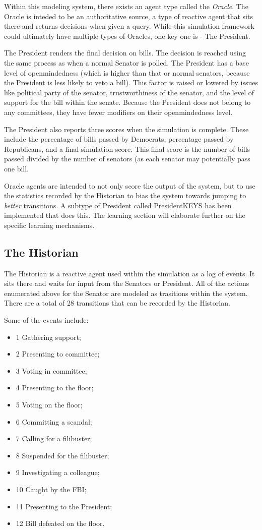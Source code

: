 \documentclass{sig-alternate}
\newenvironment{smallitem}
 {\setlength{\topsep}{0pt}
  \setlength{\partopsep}{0pt}
  \setlength{\parskip}{0pt}
  \begin{itemize}
   \setlength{\leftmargin}{.2in}
  \setlength{\parsep}{0pt}
  \setlength{\parskip}{0pt}
  \setlength{\itemsep}{0pt}}
 {\end{itemize}}
\newcommand{\bi}{\begin{smallitem}}
\newcommand{\ei}{\end{smallitem}}
\begin{document}
Within this modeling system, there exists an agent type called the {\em Oracle}. The Oracle is inteded to be an authoritative source, a type 
of reactive agent that sits there and returns decisions when given
a query. While this simulation framework could ultimately have 
multiple types of 
Oracles, one key one is - The President.

The President renders the final decision on bills. The decision is
reached using the same process as when a normal Senator is polled. The
President has a base level of openmindedness (which is higher than
that or normal senators, because the President is less likely to veto
a bill). This factor is raised or lowered by issues like political party of the senator,
trustworthiness of the senator, and the level of support for the bill
within the senate. Because the President does not belong to any committees, 
they have fewer modifiers on their openmindedness level. 

The President also reports three scores when the simulation is complete.
These include the percentage of bills passed by Democrats, percentage passed by Republicans, and a final simulation score. This final score
is the number of bills passed divided by the number of senators (as
each senator may potentially pass one bill. 

Oracle agents are intended to not only score the output of the system, 
but to use the statistics recorded by the Historian to bias the system
towards jumping to {\em better} transitions. 
A subtype of President called PresidentKEYS has been implemented that
does this. The learning section will elaborate further on the specific 
learning mechanisms.

\subsection{The Historian}
\label{sec:historian}

The Historian is a reactive agent used within the simulation as a log of events. It sits there and waits for input from the Senators or President.
All of the actions enumerated above for the Senator are modeled as trasitions within the system. 
There are a total of 28 transitions that can be recorded by the Historian.  

Some of the events include:
\bi
\item [1] Gathering support;
\item [2] Presenting to committee;
\item [3] Voting in committee;
\item [4] Presenting to the floor;
\item [5] Voting on the floor;
\item [6] Committing a scandal;
\item [7] Calling for a filibuster;
\item [8] Suspended for the filibuster;
\item [9] Investigating a colleague;
\item [10] Caught by the FBI;
\item [11] Presenting to the President;
\item [12] Bill defeated on the floor.
\ei
\end{document}
